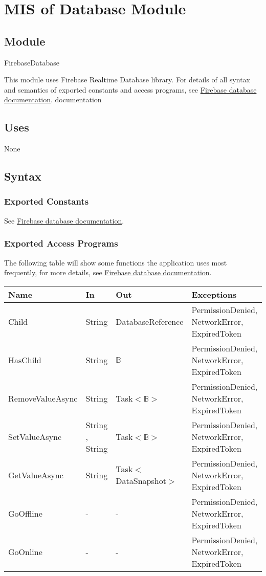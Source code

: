 \documentclass[12pt, titlepage]{article}
\begin{document}
\section{MIS of Database Module} \label{mDB}

\subsection{Module}

FirebaseDatabase

\noindent This module uses Firebase Realtime Database library. For details of all syntax and semantics of exported constants and access programs, see \href{https://firebase.google.com/docs/reference/unity/namespace/firebase/database}{Firebase database documentation}.
documentation
\subsection{Uses}

None

\subsection{Syntax}

\subsubsection{Exported Constants}
See \href{https://firebase.google.com/docs/reference/unity/namespace/firebase/database}{Firebase database documentation}.
\subsubsection{Exported Access Programs}
The following table will show some functions the application uses most frequently, for more details, see \href{https://firebase.google.com/docs/reference/unity/namespace/firebase/database}{Firebase database documentation}.
\begin{center}
\begin{tabular}{p{4cm} p{2cm} p{4cm} p{4cm}}
\hline
\textbf{Name} & \textbf{In} & \textbf{Out} & \textbf{Exceptions} \\
\hline
Child & String & DatabaseReference & PermissionDenied, NetworkError, ExpiredToken \\
HasChild & String & $\mathbb{B}$ & PermissionDenied, NetworkError, ExpiredToken \\
RemoveValueAsync & String & Task$<\mathbb{B}>$ & PermissionDenied,  NetworkError,  ExpiredToken \\
SetValueAsync & String , String & Task$<\mathbb{B}>$ & PermissionDenied,  NetworkError,  ExpiredToken \\
GetValueAsync & String & Task$<$DataSnapshot$>$ & PermissionDenied, NetworkError,  ExpiredToken \\
GoOffline & - & - & PermissionDenied, NetworkError,  ExpiredToken \\
GoOnline & - & - & PermissionDenied, NetworkError,  ExpiredToken \\
\hline
\end{tabular}
\end{center}
\end{document}
